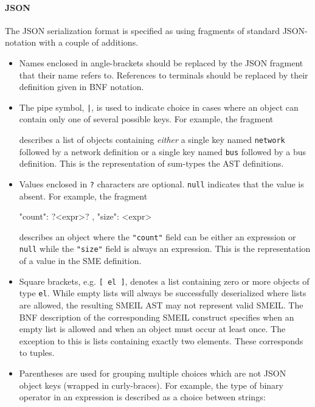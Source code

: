 \documentclass{article}
\begin{document}
\paragraph{JSON} The JSON serialization format is specified as using fragments of standard
JSON-notation with a couple of additions.
\begin{itemize}
\item Names enclosed in angle-brackets should be replaced by the JSON fragment
  that their name refers to. References to terminals should be replaced by their
  definition given in BNF notation.
\item The pipe symbol, \verb!|!, is used to indicate choice in cases where an
  object can contain only one of several possible keys. For example, the fragment
\begin{jsoncode}  
\end{jsoncode}
  describes a list of objects containing \textit{either} a single key named
  \texttt{network} followed by a network definition or a single key named
  \texttt{bus} followed by a bus definition. This is the representation of
  sum-types the AST definitions.
\item Values enclosed in \verb!?! characters are optional. \texttt{null}
  indicates that the value is absent. For example, the fragment
  \begin{jsoncode}
{ "count": ?<expr>?
, "size": <expr>
}
\end{jsoncode}
  describes an object where the \texttt{"count"} field can be either an expression or
  \texttt{null} while the \texttt{"size"} field is always an expression. This is
  the representation of a  value in the SME definition.
\item Square brackets, e.g. \verb![ el ]!, denotes a list containing zero or
  more objects of type \texttt{el}. While empty lists will always be
  successfully deserialized where lists are allowed, the resulting SMEIL AST may
  not represent valid SMEIL. The BNF description of the corresponding SMEIL
  construct specifies when an empty list is allowed and when an object must
  occur at least once. The exception to this is lists containing exactly two
  elements. These corresponds to tuples.
\item Parentheses are used for grouping multiple choices which are not JSON
  object keys (wrapped in curly-braces). For example, the type of binary
  operator in an expression is described as a choice between strings:
\begin{jsoncode}
{ "bin-op": ( "plus-op"
            | "minus-op"
            | ...
            )
\end{jsoncode}

\end{itemize}
\end{document}
